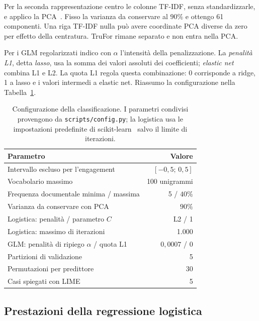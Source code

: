 Per la seconda rappresentazione centro le colonne TF-IDF, senza standardizzarle, e applico la PCA~\cite{jolliffe2016principal}. Fisso la varianza da conservare al $90\%$ e ottengo 61 componenti. Una riga TF-IDF nulla può avere coordinate PCA diverse da zero per effetto della centratura. TruFor rimane separato e non entra nella PCA.

Per i GLM regolarizzati indico con $\alpha$ l'intensità della penalizzazione. La \emph{penalità L1}, detta \emph{lasso}, usa la somma dei valori assoluti dei coefficienti; \emph{elastic net} combina L1 e L2. La quota L1 regola questa combinazione: 0 corrisponde a ridge, 1 a lasso e i valori intermedi a elastic net. Riassumo la configurazione nella Tabella~\ref{tab:classificazione-parametri}.

\begin{table}[htbp]
    \centering
    \small
    \caption{Configurazione della classificazione. I parametri condivisi provengono da \texttt{scripts/config.py}; la logistica usa le impostazioni predefinite di scikit-learn~\cite{scikit-learn} salvo il limite di iterazioni.}
    \label{tab:classificazione-parametri}
    \begin{tabular}{@{}lr@{}}
        \toprule
        Parametro & Valore \\
        \midrule
        Intervallo escluso per l'engagement & $[-0{,}5;\,0{,}5]$ \\
        Vocabolario massimo & 100 unigrammi \\
        Frequenza documentale minima / massima & 5 / $40\%$ \\
        Varianza da conservare con PCA & $90\%$ \\
        Logistica: penalità / parametro $C$ & L2 / 1 \\
        Logistica: massimo di iterazioni & 1.000 \\
        GLM: penalità di ripiego $\alpha$ / quota L1 & $0{,}0007$ / 0 \\
        Partizioni di validazione & 5 \\
        Permutazioni per predittore & 30 \\
        Casi spiegati con LIME & 5 \\
        \bottomrule
    \end{tabular}
\end{table}

\subsection{Prestazioni della regressione logistica}
\label{subsec:risultati-classificazione-logistica}

